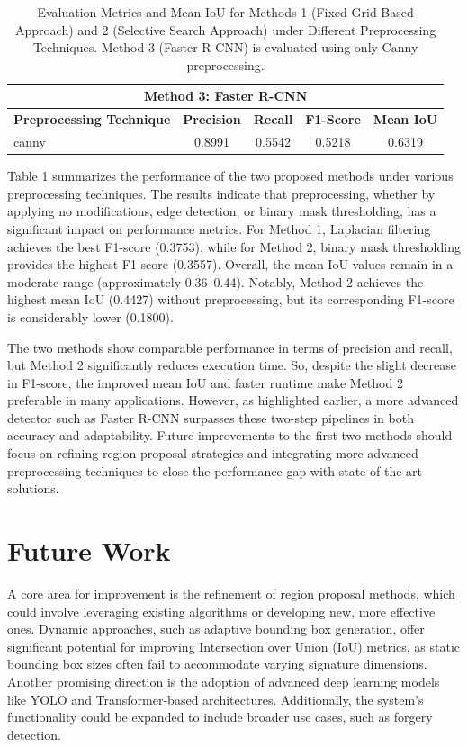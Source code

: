 \documentclass[a4paper,12pt]{article}
\begin{document}
\begin{table}[ht]
\begin{tabular}{|l|c|c|c|c|}
    \hline
    \multicolumn{5}{|c|}{\textbf{Method 3: Faster R-CNN}} \\ \hline
    \textbf{Preprocessing Technique} & \textbf{Precision} & \textbf{Recall} & \textbf{F1-Score} & \textbf{Mean IoU} \\ \hline
    canny             & 0.8991             & 0.5542          & 0.5218            & 0.6319            \\ \hline
    \end{tabular}
\caption{\centering Evaluation Metrics and Mean IoU for Methods 1 (Fixed Grid-Based Approach) and 2 (Selective Search Approach) under Different Preprocessing Techniques. Method 3 (Faster R-CNN) is evaluated using only Canny preprocessing.}
\end{table}

Table 1 summarizes the performance of the two proposed methods under various preprocessing techniques. The results indicate that preprocessing, whether by applying no modifications, edge detection, or binary mask thresholding, has a significant impact on performance metrics. For Method 1, Laplacian filtering achieves the best F1-score (0.3753), while for Method 2, binary mask thresholding provides the highest F1-score (0.3557). Overall, the mean IoU values remain in a moderate range (approximately 0.36–0.44). Notably, Method 2 achieves the highest mean IoU (0.4427) without preprocessing, but its corresponding F1-score is considerably lower (0.1800).  

The two methods show comparable performance in terms of precision and recall, but Method 2 significantly reduces execution time. So, despite the slight decrease in F1-score, the improved mean IoU and faster runtime make Method 2 preferable in many applications. However, as highlighted earlier, a more advanced detector such as Faster R-CNN surpasses these two-step pipelines in both accuracy and adaptability. Future improvements to the first two methods should focus on refining region proposal strategies and integrating more advanced preprocessing techniques to close the performance gap with state-of-the-art solutions.

\section{Future Work}
A core area for improvement is the refinement of region proposal methods, which could involve leveraging existing algorithms or developing new, more effective ones. Dynamic approaches, such as adaptive bounding box generation, offer significant potential for improving Intersection over Union (IoU) metrics, as static bounding box sizes often fail to accommodate varying signature dimensions. Another promising direction is the adoption of advanced deep learning models like YOLO and Transformer-based architectures. Additionally, the system's functionality could be expanded to include broader use cases, such as forgery detection.
\end{document}
